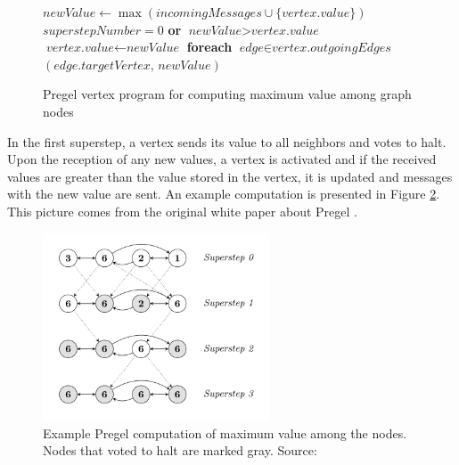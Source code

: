 \begin{figure}[!htbp]

\begin{codebox}
  \li $\textit{newValue} \leftarrow \max (\textit{incomingMessages} \cup \{\textit{vertex.value}\})$
  \li \If  $superstepNumber = 0$ \textbf{or} $\textit{newValue} > \textit{vertex.value}$
  \li \Then
   $\textit{vertex.value} \leftarrow \textit{newValue}$
   \li \textbf{foreach} $\textit{edge} \in \textit{vertex.outgoingEdges}$ \Then
  \li {}$(\textit{edge.targetVertex, newValue})$
  	  \End
  \li \Else
  \li {}
      \End
\end{codebox}
\caption{Pregel vertex program for computing maximum value among graph nodes}\label{psc:pregelmaxval}
\end{figure}

In the first superstep, a vertex sends its value to all neighbors and votes to halt. Upon the reception of any new values, a vertex is activated and if the received values are greater than the value stored in the vertex, it is updated and messages with the new value are sent. An example computation is presented in Figure \ref{img:pregelmaxval}. This picture comes from the original white paper about Pregel \cite{pregel}.

\begin{figure}[!ht]
\begin{center}
\includegraphics[width=0.6\textwidth]{PregelMaxVal.png}
\caption{Example Pregel computation of maximum value among the nodes. Nodes that voted to halt are marked gray. Source: \cite{pregel}}\label{img:pregelmaxval}
\end{center}
\end{figure}

